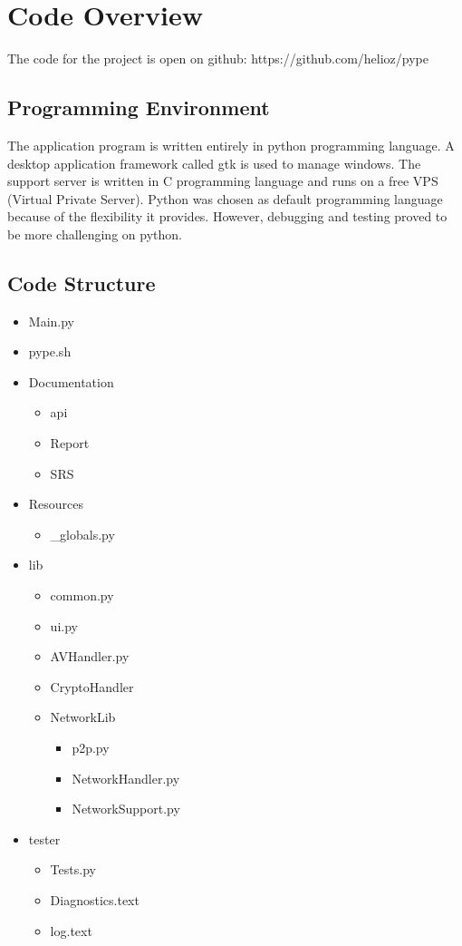 \documentclass[a4paper,11pt]{article}
\begin{document}
\section{Code Overview}
The code for the project is open on github: https://github.com/helioz/pype

\subsection{Programming Environment}
The application program is written entirely in python programming language. A desktop application framework called gtk is used to manage windows. The support server is written in C programming language and runs on a free VPS (Virtual Private Server). Python was chosen as default programming language because of the flexibility it provides. However, debugging and testing proved to be more challenging on python.

\subsection{Code Structure}
\begin{itemize}
\item Main.py
\item pype.sh
\item Documentation
  \begin{itemize}
  \item api
  \item Report
  \item SRS
  \end {itemize}
\item Resources
  \begin{itemize}
  \item \_globals.py
  \end{itemize}
  
\item lib
  \begin{itemize}
  \item common.py
  \item ui.py
  \item AVHandler.py
  \item CryptoHandler
  \item NetworkLib
    \begin{itemize}
    \item p2p.py
    \item NetworkHandler.py
    \item NetworkSupport.py
    \end{itemize}
  \end{itemize}  
\item tester
  \begin {itemize}
  \item Tests.py
  \item Diagnostics.text
  \item log.text
  \end{itemize}
\end {itemize}
\end{document}
